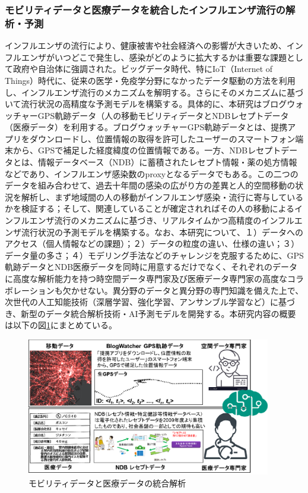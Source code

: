 \subsubsection{モビリティデータと医療データを統合したインフルエンザ流行の解析・予測}
インフルエンザの流行により、健康被害や社会経済への影響が大きいため、インフルエンザがいつどこで発生し、感染がどのように拡大するかは重要な課題として政府や自治体に強調された。ビッグデータ時代、特にIoT（Internet of Things）時代に、従来の医学・免疫学分野になかったデータ駆動の方法を利用し、インフルエンザ流行のメカニズムを解明する。さらにそのメカニズムに基づいて流行状況の高精度な予測モデルを構築する。具体的に、本研究はブログウォッチャーGPS軌跡データ（人の移動モビリティデータとNDBレセプトデータ（医療データ）を利用する。ブログウォッチャーGPS軌跡データとは、提携アプリをダウンロードし、位置情報の取得を許可したユーザーのスマートフォン端末から、GPSで補足した経度緯度の位置情報である。一方、NDBレセプトデータとは、情報データベース（NDB）に蓄積されたレセプト情報・薬の処方情報などであり、インフルエンザ感染数のproxyとなるデータでもある。この二つのデータを組み合わせて、過去十年間の感染の広がり方の差異と人的空間移動の状況を解析し、まず地域間の人の移動がインフルエンザ感染・流行に寄与しているかを検証する；そして、関連していることが確定されればその人の移動によるインフルエンザ流行のメカニズムに基づき、リアルタイムかつ高精度のインフルエンザ流行状況の予測モデルを構築する。なお、本研究について、１）データへのアクセス（個人情報などの課題）；２）データの粒度の違い、仕様の違い；３）データ量の多さ；４）モデリング手法などのチャレンジを克服するために、GPS軌跡データとNDB医療データを同時に用意するだけでなく、それぞれのデータに高度な解析能力を持つ時空間データ専門家及び医療データ専門家の高度なコラボレーションも欠かせない。異分野のデータと異分野の専門知識を備えた上で、次世代の人工知能技術（深層学習、強化学習、アンサンブル学習など）に基づき、新型のデータ統合解析技術・AI予測モデルを開発する。本研究内容の概要は以下の図\ref{fig:intro2_jiang}にまとめている。

\begin{figure}[h]
	\centering	
	\includegraphics[width=0.95\textwidth]{Kyo/figure/intro2.eps}
	\caption{モビリティデータと医療データの統合解析}
	\label{fig:intro2_jiang}
\end{figure}
